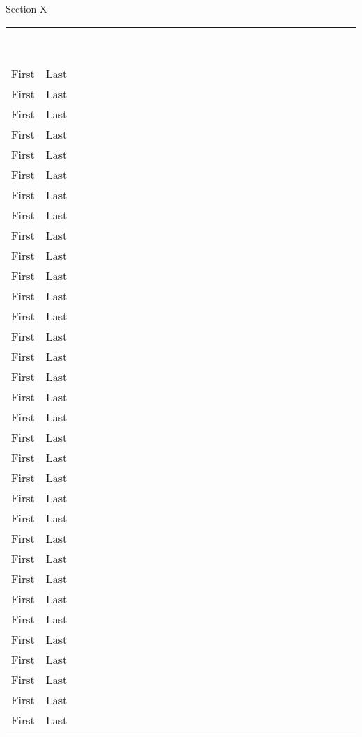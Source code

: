 \documentclass[12pt]{article}
\newcommand{\ab}{\multicolumn{1}{l}{ ~ ~ }}
\begin{document}
\begin{Large}Section X\end{Large}
\bigskip

\begin{tabular}{ll|l|l|l|l|l|l|l|l|l|l|l|l}
          & \ab                 &\ab&\ab&\ab&\ab&\ab&\ab&\ab&\ab&\ab&\ab&\ab&\ab \\
First & Last   & & & & & & & & & & & & \\ \hline
First & Last   & & & & & & & & & & & & \\ \hline
First & Last   & & & & & & & & & & & & \\ \hline
First & Last   & & & & & & & & & & & & \\ \hline
First & Last   & & & & & & & & & & & & \\ \hline
First & Last   & & & & & & & & & & & & \\ \hline
First & Last   & & & & & & & & & & & & \\ \hline
First & Last   & & & & & & & & & & & & \\ \hline
First & Last   & & & & & & & & & & & & \\ \hline
First & Last   & & & & & & & & & & & & \\ \hline
First & Last   & & & & & & & & & & & & \\ \hline
First & Last   & & & & & & & & & & & & \\ \hline
First & Last   & & & & & & & & & & & & \\ \hline
First & Last   & & & & & & & & & & & & \\ \hline
First & Last   & & & & & & & & & & & & \\ \hline
First & Last   & & & & & & & & & & & & \\ \hline
First & Last   & & & & & & & & & & & & \\ \hline
First & Last   & & & & & & & & & & & & \\ \hline
First & Last   & & & & & & & & & & & & \\ \hline
First & Last   & & & & & & & & & & & & \\ \hline
First & Last   & & & & & & & & & & & & \\ \hline
First & Last   & & & & & & & & & & & & \\ \hline
First & Last   & & & & & & & & & & & & \\ \hline
First & Last   & & & & & & & & & & & & \\ \hline
First & Last   & & & & & & & & & & & & \\ \hline
First & Last   & & & & & & & & & & & & \\ \hline
First & Last   & & & & & & & & & & & & \\ \hline
First & Last   & & & & & & & & & & & & \\ \hline
First & Last   & & & & & & & & & & & & \\ \hline
First & Last   & & & & & & & & & & & & \\ \hline
First & Last   & & & & & & & & & & & & \\ \hline
First & Last   & & & & & & & & & & & & \\ \hline
First & Last   & & & & & & & & & & & &
\end{tabular}

  
\end{document}
